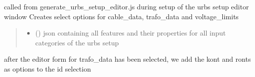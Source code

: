\documentclass[letterpaper,10pt,english]{sphinxmanual}
\begin{document}

\begin{fulllineitems}
\label{\detokenize{docs_gui/js_api/urbs_editor/transmission_editor:populateTransmissionEditorList}}
\pysigstartsignatures
{}
\pysigstopsignatures
\sphinxAtStartPar
called from generate\_urbs\_setup\_editor.js during setup of the urbs setup editor window
Creates select options for cable\_data, trafo\_data and voltage\_limits
\begin{quote}\begin{description}
\begin{itemize}
\item {} 
\sphinxAtStartPar
{} () \textendash{} json containing all features and their properties for all input categories of the urbs setup

\end{itemize}

\end{description}\end{quote}

\end{fulllineitems}


\begin{fulllineitems}
\label{\detokenize{docs_gui/js_api/urbs_editor/transmission_editor:fillTrafoDataEditorIdSelect}}
\pysigstartsignatures
{}
\pysigstopsignatures
\sphinxAtStartPar
after the editor form for trafo\_data has been selected, we add the kont and ronts as options to the id selection

\end{fulllineitems}

\end{document}
